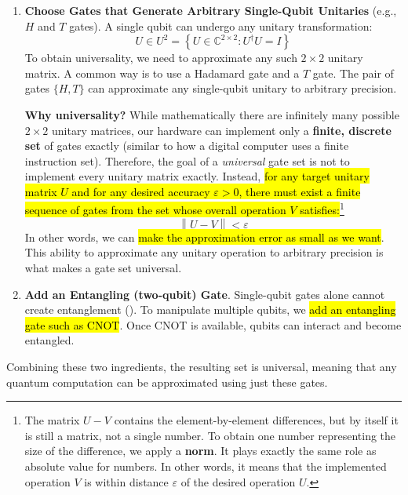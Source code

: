 \begin{enumerate}
    \item \textbf{Choose Gates that Generate Arbitrary Single-Qubit Unitaries} (e.g., $H$ and $T$ gates). A single qubit can undergo any unitary transformation:
    \begin{equation*}
        U \in U^{2} = \left\{U \in \mathbb{C}^{2 \times 2} : U^\dagger U = I\right\}
    \end{equation*}
    To obtain universality, we need to approximate any such $2 \times 2$ unitary matrix. A common way is to use a Hadamard gate and a $T$ gate. The pair of gates $\{H, T\}$ can approximate any single-qubit unitary to arbitrary precision.

    \textcolor{Green3}{ \textbf{Why universality?}} While mathematically there are infinitely many possible $2 \times 2$ unitary matrices, our hardware can implement only a \textbf{finite, discrete set} of gates exactly (similar to how a digital computer uses a finite instruction set). Therefore, the goal of a \emph{universal} gate set is not to implement every unitary matrix exactly. Instead, \hl{for any target unitary matrix $U$ and for any desired accuracy $\varepsilon > 0$, there must exist a finite sequence of gates from the set whose overall operation $V$ satisfies:}\footnote{%
        The matrix $U-V$ contains the element-by-element differences, but by itself it is still a matrix, not a single number. To obtain one number representing the size of the difference, we apply a \textbf{norm}. It plays exactly the same role as absolute value for numbers. In other words, it means that the implemented operation $V$ is within distance $\varepsilon$ of the desired operation $U$.
    }
    \begin{equation*}
        \left\|U - V\right\| < \varepsilon
    \end{equation*}
    In other words, we can \hl{make the approximation error as small as we want}. This ability to approximate any unitary operation to arbitrary precision is what makes a gate set universal.


    \item \textbf{Add an Entangling (two-qubit) Gate}. Single-qubit gates alone cannot create entanglement (). To manipulate multiple qubits, we \hl{add an entangling gate such as CNOT}. Once CNOT is available, qubits can interact and become entangled.
\end{enumerate}
Combining these two ingredients, the resulting set is universal, meaning that any quantum computation can be approximated using just these gates.